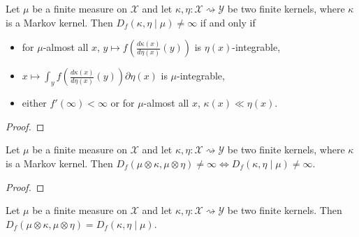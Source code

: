 \begin{lemma}
  \label{lem:condFDiv_ne_top_iff}
  \leanok
  Let $\mu$ be a finite measure on $\mathcal X$ and let $\kappa, \eta : \mathcal X \rightsquigarrow \mathcal Y$ be two finite kernels, where $\kappa$ is a Markov kernel.
  Then $D_f(\kappa, \eta \mid \mu) \ne \infty$ if and only if
  \begin{itemize}
    \item for $\mu$-almost all $x$, $y \mapsto f \left( \frac{d\kappa(x)}{d\eta(x)}(y) \right)$ is $\eta(x)$-integrable,
    \item $x \mapsto \int_y f \left( \frac{d\kappa(x)}{d\eta(x)}(y) \right) \partial \eta(x)$ is $\mu$-integrable,
    \item either $f'(\infty) < \infty$ or for $\mu$-almost all $x$, $\kappa(x) \ll \eta(x)$.
  \end{itemize}
\end{lemma}

\begin{proof} \leanok
{}
\end{proof}

\begin{lemma}
  \label{lem:fDiv_compProd_ne_top_iff}
  \leanok
  Let $\mu$ be a finite measure on $\mathcal X$ and let $\kappa, \eta : \mathcal X \rightsquigarrow \mathcal Y$ be two finite kernels, where $\kappa$ is a Markov kernel.
  Then $D_f(\mu \otimes \kappa, \mu \otimes \eta) \ne \infty \iff D_f(\kappa, \eta \mid \mu) \ne \infty$.
\end{lemma}

\begin{proof} \leanok
{}
\end{proof}

\begin{lemma}
  \label{lem:fDiv_compProd_left}
  \leanok
  Let $\mu$ be a finite measure on $\mathcal X$ and let $\kappa, \eta : \mathcal X \rightsquigarrow \mathcal Y$ be two finite kernels.
  Then $D_f(\mu \otimes \kappa, \mu \otimes \eta) = D_f(\kappa, \eta \mid \mu)$.
\end{lemma}

